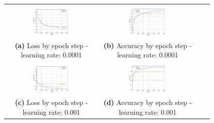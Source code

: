 \documentclass[11pt]{article}
\begin{document}
\begin{figure}[h!]
    \centering
    \begin{tabular}{cccc}
    
    \includegraphics[width=0.45\textwidth]{figures/q_3_2_loss_one_tenth.png}  &  \includegraphics[width=0.45\textwidth]{figures/q_3_2_accuracy_one_tenth.png}  \\  
    \textbf{(a)} Loss by epoch step - learning rate: 0.0001 & \textbf{(b)} Accuracy by epoch step - learning rate: 0.0001\\ [6pt] 

    \includegraphics[width=0.45\textwidth]{figures/q_3_1_loss.png}  &  \includegraphics[width=0.45\textwidth]{figures/q_3_1_accuracy.png}  \\  
    \textbf{(c)} Loss by epoch step - learning rate: 0.001 & \textbf{(d)} Accuracy by epoch step - learning rate: 0.001\\ [6pt] 


\end{tabular}
\end{figure}
\end{document}
